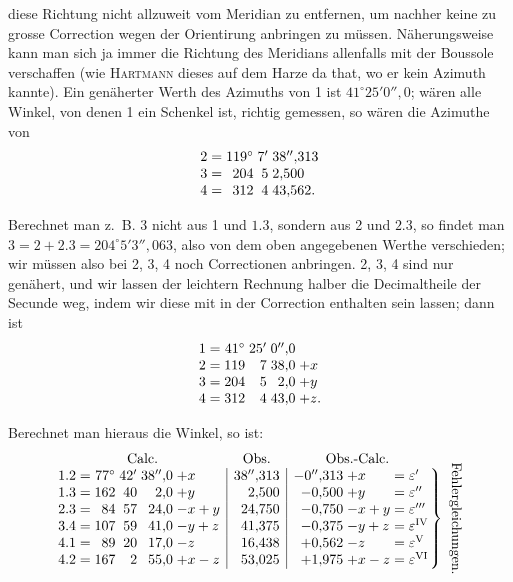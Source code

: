 \noindent diese Richtung nicht allzuweit vom Meridian zu entfernen, um nachher keine zu grosse Correction wegen der Orientirung anbringen zu müssen. Näherungsweise kann man sich ja immer die Richtung des Meridians allenfalls mit der Boussole verschaffen (wie \textsc{Hartmann} dieses auf dem Harze da that, wo er kein Azimuth kannte). Ein genäherter Werth des Azimuths von 1 ist \(41^\circ25'0''{,}0\); wären alle Winkel, von denen 1 ein Schenkel ist, richtig gemessen, so wären die Azimuthe von
\[
\begin{array}{@{}r@{\;=\;}r@{\;}r@{\;}l@{}}
 2&119^\circ&7'&38''{,}313\\
 3&204&5&2{,}500\\
 4&312&4&43{,}562.
\end{array}
\]

Berechnet man z.~B. 3 nicht aus 1 und \(1.3\), sondern aus 2 und \(2.3\), so findet man \(3=2+2.3=204^\circ5'3''{,}063\), also von dem oben angegebenen Werthe verschieden; wir müssen also bei 2, 3, 4 noch Correctionen anbringen. 2, 3, 4 sind nur genähert, und wir lassen der leichtern Rechnung halber die Decimaltheile der Secunde weg, indem wir diese mit in der Correction enthalten sein lassen; dann ist
\[
\begin{array}{@{}r@{\;=\;}r@{\;}r@{\;}r@{\;}l@{}}
 1&41^\circ&25'&0''{,}0&\\
 2&119&7&38{,}0&+x\\
 3&204&5&2{,}0&+y\\
 4&312&4&43{,}0&+z.
\end{array}
\]

Berechnet man hieraus die Winkel, so ist:
\[
\begin{array}{@{}r@{\;=\;}r@{\;}r@{\;}r@{\;}l|r|r@{\;}l@{\;=\;}l@{}}
 \multicolumn{5}{c}{\text{Calc.}}&
 \multicolumn{1}{c}{\text{Obs.}}&
 \multicolumn{3}{c}{\text{Obs.-Calc.}}\\
 1.2&77^\circ&42'&38''{,}0&+x&38''{,}313&-0''{,}313&+x&\varepsilon'\\
 1.3&162&40&2{,}0&+y&2{,}500&-0{,}500&+y&\varepsilon''\\
 2.3&84&57&24{,}0&-x+y&24{,}750&-0{,}750&-x+y&\varepsilon'''\\
 3.4&107&59&41{,}0&-y+z&41{,}375&-0{,}375&-y+z&\varepsilon^{\mathrm{IV}}\\
 4.1&89&20&17{,}0&-z&16{,}438&+0{,}562&-z&\varepsilon^{\mathrm{V}}\\
 4.2&167&2&55{,}0&+x-z&53{,}025&+1{,}975&+x-z&\varepsilon^{\mathrm{VI}}
\end{array}
\raisebox{-.5\baselineskip}{%
 \(\left.\vphantom{\begin{array}{c}0\\0\\0\\0\\0\\0\end{array}}\right\}\)%
 \enspace\rotatebox[origin=c]{-90}{Fehlergleichungen.}%
}
\]

